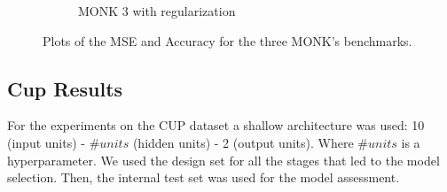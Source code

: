 \documentclass[11pt]{article}
\begin{document}
\begin{figure}[H]
\begin{subfigure}{0.9\textwidth}
                    \caption{MONK 3 with regularization}
                    \label{fig:monk3_reg}
                \end{subfigure}
                
\caption{Plots of the MSE and Accuracy for the three MONK’s benchmarks.}
\label{fig:monk_plots} 
\end{figure}

\subsection{Cup Results}
\label{sec:cup}
For the experiments on the CUP dataset a shallow architecture was used: 10 (input units) - $\#units$ (hidden units) - 2 (output units). Where $\#units$ is a hyperparameter. We used the design set for all the stages that led to the model selection. Then, the internal test set was used for the model assessment.\\
\end{document}
